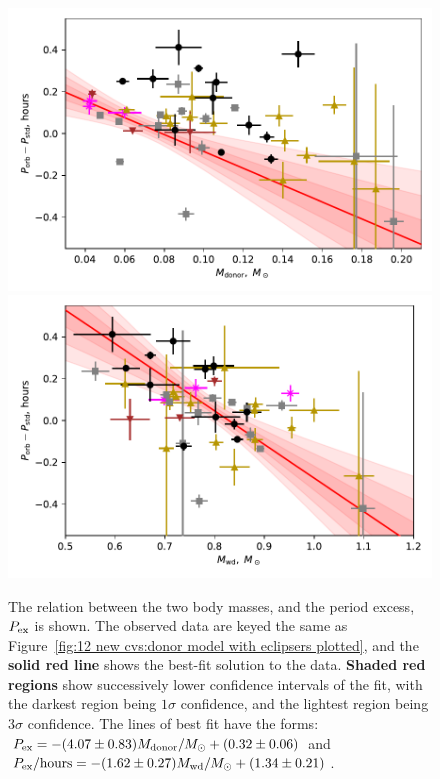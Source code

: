 \begin{figure}
    \centering
    \includegraphics[width=\columnwidth]{figures/results/Mdot/Period_excess_Mr.pdf}
    \includegraphics[width=\columnwidth]{figures/results/Mdot/Period_excess_Mwd.pdf}
    \caption{The relation between the two body masses, and the period excess, $P_{\rm ex}$ is shown. The observed data are keyed the same as Figure~\ref{fig:12 new cvs:donor model with eclipsers plotted}, and the {\bf solid red line} shows the best-fit solution to the data. {\bf Shaded red regions} show successively lower confidence intervals of the fit, with the darkest region being $1\sigma$ confidence, and the lightest region being $3\sigma$ confidence. The lines of best fit have the forms: $P_{\rm ex} = -(4.07\pm0.83) M_{\rm donor}/M_\odot + (0.32\pm0.06)$ and $P_{\rm ex} / \mathrm{hours} = -(1.62\pm0.27) M_{\rm wd}/M_\odot + (1.34\pm0.21)$.}
    \label{fig:period excess}
\end{figure}

